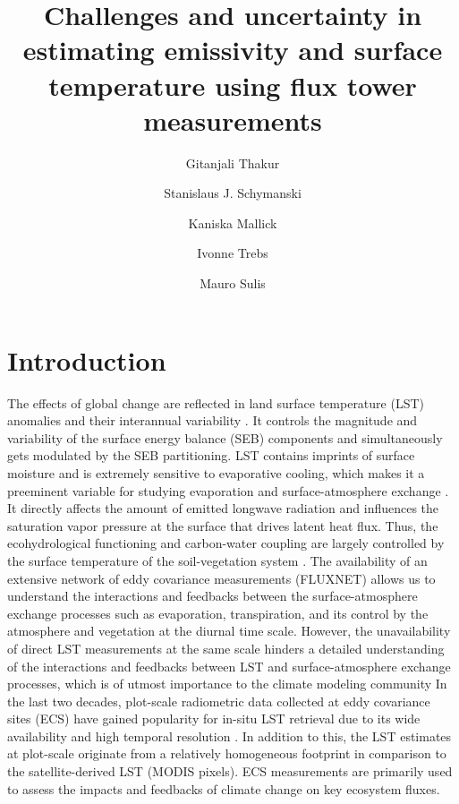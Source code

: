 \documentclass[fleqn,10pt]{wlscirep}
\title{ Challenges and uncertainty in estimating emissivity and surface temperature using flux tower measurements}
\author[1,*]{Gitanjali Thakur}
\author[1,*]{ Stanislaus J. Schymanski}
\author[1]{Kaniska Mallick }
\author[1]{Ivonne Trebs}
\author[1]{Mauro Sulis}
\affil[1]{Luxembourg Institute of Science and Technology, ERIN, Belvaux, L-4422, Luxembourg}
\affil[*]{gitanjali.thakur@list.lu}
\affil[*]{stanislaus.schymanski@list.lu}
\begin{document}
\flushbottom
\maketitle
%
%
\thispagestyle{empty}


\section*{Introduction}

The effects of global change are reflected in land surface temperature (LST) anomalies and their interannual variability \cite{rowell2005scenario}. It controls the magnitude and variability of the surface energy balance (SEB) components and simultaneously gets modulated by the SEB partitioning\cite{mallick2015reintroducing,timmermans2007intercomparison}. LST contains imprints of surface moisture and is extremely sensitive to evaporative cooling, which makes it a preeminent variable for studying evaporation and surface-atmosphere exchange \cite{mallick2018critical,trebs2021role,kustas2009advances}. It directly affects the amount of emitted longwave radiation and influences the saturation vapor pressure at the surface that drives latent heat flux. Thus, the ecohydrological functioning and carbon-water coupling are largely controlled by the surface temperature of the soil-vegetation system \cite{still2021imaging}.
 The availability of an extensive network of eddy covariance measurements (FLUXNET) allows us to understand the interactions and feedbacks between the surface-atmosphere exchange processes such as evaporation, transpiration, and its control by the atmosphere and vegetation at the diurnal time scale. However, the unavailability of direct LST measurements at the same scale hinders a detailed understanding of the interactions and feedbacks between LST and surface-atmosphere exchange processes, which is of utmost importance to the climate modeling community \cite{migliavacca2021three} 
 In the last two decades, plot-scale radiometric data collected at eddy covariance sites (ECS) have gained popularity for in-situ LST retrieval due to its wide availability and high temporal resolution \cite{stoy2013data,cullen2007energy}. In addition to this, the LST estimates at plot-scale originate from a relatively homogeneous footprint in comparison to the satellite-derived LST (MODIS pixels). ECS measurements are primarily used to assess the impacts and feedbacks of climate change on key ecosystem fluxes\cite{baldocchi2001fluxnet}. 
\end{document}
